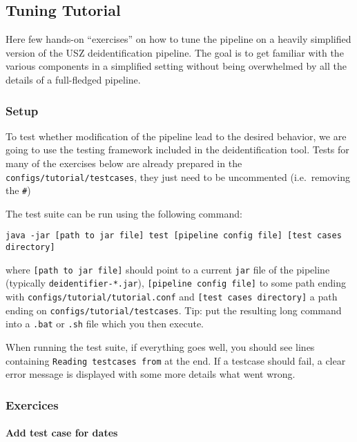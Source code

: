 \subsection{Tuning Tutorial}\label{tuning-tutorial}

Here few hands-on ``exercises'' on how to tune the pipeline on a heavily
simplified version of the USZ deidentification pipeline. The goal is to
get familiar with the various components in a simplified setting without
being overwhelmed by all the details of a full-fledged pipeline.

\subsubsection{Setup}\label{setup}

To test whether modification of the pipeline lead to the desired
behavior, we are going to use the testing framework included in the
deidentification tool. Tests for many of the exercises below are already
prepared in the \texttt{configs/tutorial/testcases}, they just need to
be uncommented (i.e.~removing the \texttt{\#})

The test suite can be run using the following command:

\begin{verbatim}
java -jar [path to jar file] test [pipeline config file] [test cases directory]
\end{verbatim}

where \texttt{{[}path\ to\ jar\ file{]}} should point to a current
\texttt{jar} file of the pipeline (typically
\texttt{deidentifier-*.jar}), \texttt{{[}pipeline\ config\ file{]}} to
some path ending with \texttt{configs/tutorial/tutorial.conf} and
\texttt{{[}test\ cases\ directory{]}} a path ending on
\texttt{configs/tutorial/testcases}. Tip: put the resulting long command
into a \texttt{.bat} or \texttt{.sh} file which you then execute.

When running the test suite, if everything goes well, you should see
lines containing \texttt{Reading\ testcases\ from} at the end. If a
testcase should fail, a clear error message is displayed with some more
details what went wrong.

\subsubsection{Exercices}\label{exercices}

\paragraph{Add test case for dates}\label{add-test-case-for-dates}

